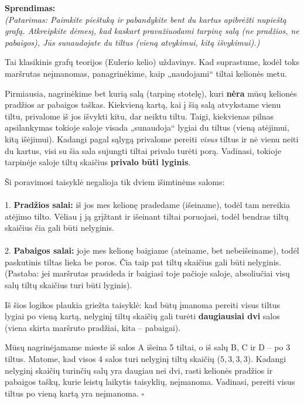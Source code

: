 \documentclass[11pt,a4paper]{scrartcl}
\newenvironment{solution}
    {\begin{list}{}{\setlength{\leftmargin}{10pt}\setlength{\rightmargin}{10pt}}\item[]}
    {\end{list}}
\begin{document}
\begin{solution}
\textbf{Sprendimas:}\\
\textit{(Patarimas: Paimkite pieštuką ir pabandykite bent du kartus apibrėžti nupieštą grafą. Atkreipkite dėmesį, kad kaskart pravažiuodami tarpinę salą (ne pradžios, ne pabaigos), Jūs sunaudojate du tiltus (vieną atvykimui, kitą išvykimui).)}

Tai klasikinis grafų teorijos (Eulerio kelio) uždavinys. Kad suprastume, kodėl toks maršrutas neįmanomas, panagrinėkime, kaip „naudojami“ tiltai kelionės metu.

Pirmiausia, nagrinėkime bet kurią salą (tarpinę stotelę), kuri \textbf{nėra} mūsų kelionės pradžios ar pabaigos taškas. Kiekvieną kartą, kai į šią salą atvykstame vienu tiltu, privalome iš jos išvykti kitu, dar neiktu tiltu. Taigi, kiekvienas pilnas apsilankymas tokioje saloje visada „sunaudoja“ lygiai du tiltus (vieną atėjimui, kitą išėjimui). Kadangi pagal sąlygą privalome pereiti \textit{visus} tiltus ir nė vienu neiti du kartus, visi su šia sala sujungti tiltai privalo turėti porą. Vadinasi, tokioje tarpinėje saloje tiltų skaičius \textbf{privalo būti lyginis}.

Ši poravimosi taisyklė negalioja tik dviem išimtinėms saloms:\\ \\
1. \textbf{Pradžios salai:} iš jos mes kelionę pradedame (išeiname), todėl tam nereikia atėjimo tilto. Vėliau į ją grįžtant ir išeinant tiltai poruojasi, todėl bendras tiltų skaičius čia gali būti nelyginis.\\ \\
2. \textbf{Pabaigos salai:} joje mes kelionę baigiame (ateiname, bet nebeišeiname), todėl paskutinis tiltas lieka be poros. Čia taip pat tiltų skaičius gali būti nelyginis.
(Pastaba: jei maršrutas prasideda ir baigiasi toje pačioje saloje, absoliučiai visų salų tiltų skaičius turi būti lyginis).

Iš šios logikos plaukia griežta taisyklė: kad būtų įmanoma pereiti visus tiltus lygiai po vieną kartą, nelyginį tiltų skaičių gali turėti \textbf{daugiausiai dvi} salos (viena skirta maršruto pradžiai, kita – pabaigai). 

Mūsų nagrinėjamame mieste iš salos A išeina 5 tiltai, o iš salų B, C ir D – po 3 tiltus. Matome, kad visos 4 salos turi nelyginį tiltų skaičių ($5, 3, 3, 3$). Kadangi nelyginį skaičių turinčių salų yra daugiau nei dvi, rasti kelionės pradžios ir pabaigos taškų, kurie leistų laikytis taisyklių, neįmanoma. Vadinasi, pereiti visus tiltus po vieną kartą yra neįmanoma. \hfill $\square$
\end{solution}
\end{document}
